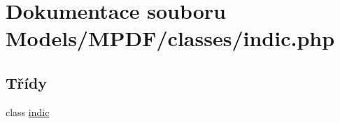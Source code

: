 \hypertarget{indic_8php}{\section{Dokumentace souboru Models/\-M\-P\-D\-F/classes/indic.php}
\label{indic_8php}
}
\subsection*{Třídy}
\begin{DoxyCompactItemize}
\item 
class \hyperlink{classindic}{indic}
\end{DoxyCompactItemize}
